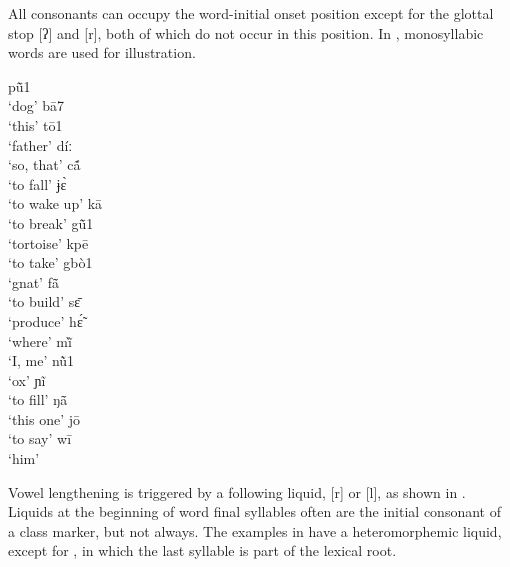 \documentclass[output=paper]{langscibook}
\begin{document}
All consonants can occupy the word-initial onset position except for the glottal stop [ʔ] and [r], both of which do not occur in this position. In , monosyllabic words are used for illustration.

\begin{exe}
    \ex \label{ex:traore:initialConsonants:8}
    \begin{multicols}{2}
        \begin{xlist}
            \ex pũ̄1\\
                `dog'
            \ex bā7\\
                `this'
            \ex tō1\\
                `father'
            \ex díː\\
                `so, that'
            \ex cã́ \\
                `to fall'
            \ex ɉɛ̀ \\
                `to wake up'
            \ex kā\\
                `to break'
            \ex gũ̄1 \\
                `tortoise'
            \ex  kpē\\
                `to take'
            \ex gbò1 \\
                `gnat'
            \ex  fã̄ \\
                `to build'
            \ex  sɛ̄ \\
                `produce'
            \ex hɛ̃́ \\
                `where'
            \ex mĩ̀\\
                `I, me'
            \ex nũ̀1 \\
                `ox'
            \ex ɲĩ\\
                `to fill'
            \ex ŋã̄ \\
                `this one'
            \ex  jō\\
                `to say'
            \ex  wī  \\
                `him'
        \end{xlist}
    \end{multicols}
\end{exe}

Vowel lengthening is triggered by a following liquid, [r] or [l], as shown in . Liquids at the beginning of word final syllables often are the initial consonant of a class marker, but not always. The examples in  have a heteromorphemic liquid, except for , in which the last syllable is part of the lexical root. 
\end{document}
